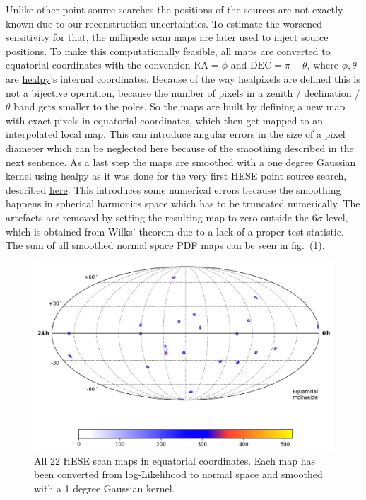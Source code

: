 Unlike other point source searches the positions of the sources are not exactly known due to our reconstruction uncertainties.
To estimate the worsened sensitivity for that, the millipede scan maps are later used to inject source positions.
To make this computationally feasible, all maps are converted to equatorial coordinates with the convention $\mathrm{RA} = \phi$ and $\mathrm{DEC} = \pi - \theta$, where $\phi, \theta$ are \href{https://healpy.readthedocs.io/en/latest/}{healpy}'s internal coordinates.
Because of the way healpixels are defined this is not a bijective operation, because the number of pixels in a zenith / declination / $\theta$ band gets smaller to the poles.
So the maps are built by defining a new map with exact pixels in equatorial coordinates, which then get mapped to an interpolated local map.
This can introduce angular errors in the size of a pixel diameter which can be neglected here because of the smoothing described in the next sentence.
As a last step the maps are smoothed with a one degree Gaussian kernel using healpy as it was done for the very first HESE point source search, described \href{https://wiki.icecube.wisc.edu/index.php/High-Energy_Starting_Event_Point_Source_Searches#Effects_of_Binning.2C_Rotation.2C_and_Smoothing}{here}.
This introduces some numerical errors because the smoothing happens in spherical harmonics space which has to be truncated numerically.
The artefacts are removed by setting the resulting map to zero outside the $6\sigma$ level, which is obtained from Wilks' theorem due to a lack of a proper test statistic.
The sum of all smoothed normal space PDF maps can be seen in fig.~(\ref{fig:hese_maps_all}).

\begin{figure}[h]
  \centering
  \includegraphics[width=.9\textwidth]{inc/srcs_summed.png}
  \caption{All 22 HESE scan maps in equatorial coordinates. Each map has been converted from log-Likelihood to normal space and smoothed with a 1 degree Gaussian kernel.}
  \label{fig:hese_maps_all}
\end{figure}


